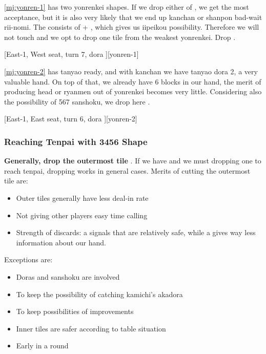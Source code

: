 \documentclass[12pt]{article}
\begin{document}
\ref{mj:yonren-1} has two yonrenkei shapes. If we drop either of , we get the most acceptance, but it is also very likely that we end up kanchan or shanpon bad-wait rii-nomi. The  consists of  + , which gives us iipeikou possibility. Therefore we will not touch  and we opt to drop one tile from the weakest yonrenkei. Drop  \citep[][p.~14]{uzaku-nankiru}.

[East-1, West seat, turn 7, dora ][yonren-1]

\ref{mj:yonren-2} has tanyao ready, and with  kanchan we have tanyao dora 2, a very valuable hand. On top of that, we already have 6 blocks in our hand, the merit of producing head or ryanmen out of  yonrenkei becomes very little. Considering also the possibility of 567 sanshoku, we drop  here \citep[][p.~16]{uzaku-nankiru}.

[East-1, East seat, turn 6, dora ][yonren-2]


\subsubsection*{Reaching Tenpai with 3456 Shape}

\textbf{Generally, drop the outermost tile} \citep{yoteru-yonrenkei}. If we have  and we must dropping one to reach tenpai, dropping  works in general cases. Merits of cutting the outermost tile are:

\begin{itemize}
\item Outer tiles generally have less deal-in rate
\item Not giving other players easy time calling
\item Strength of discards: a  signals that  are relatively safe, while a  gives way less information about our hand.
\end{itemize}

Exceptions are:

\begin{itemize}
\item Doras and sanshoku are involved
\item To keep the possibility of catching kamichi's akadora
\item To keep possibilities of improvements
\item Inner tiles are safer according to table situation
\item Early in a round
\end{itemize}
\end{document}
